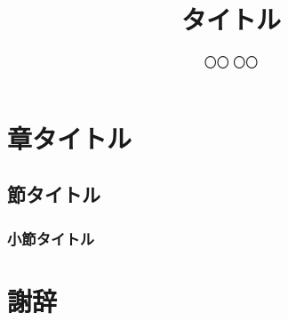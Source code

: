 \documentclass{jsreport}
\begin{document}
\title{タイトル}  %
\author{〇〇 〇〇}  %


\maketitle

\tableofcontents
\clearpage


\chapter{章タイトル}

\section{節タイトル}

\subsection{小節タイトル}


\chapter*{謝辞}


\begin{thebibliography}{99}

\end{thebibliography}
\end{document}
